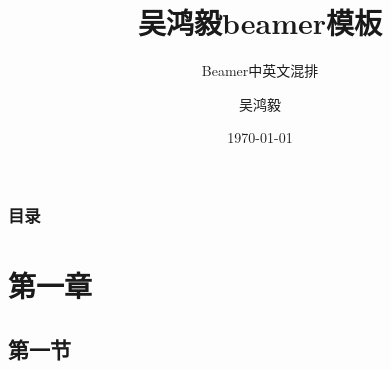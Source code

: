\documentclass[presentation]{beamer}
\title[beamer模板]{吴鸿毅beamer模板}%
\subtitle{Beamer中英文混排}
\author{吴鸿毅}
\institute[北京大学\ 物理学院] %
{
北京大学\ 物理学院 \\ %
\medskip
\textit{wuhongyi@qq.com} %
}
\date{\today}
\begin{document}
\begin{frame}
\titlepage  %
\end{frame}


\begin{frame}
\frametitle{目录}  %
    \tableofcontents     %
\end{frame}


\section{第一章} %
\subsection{第一节}  %
\end{document}
